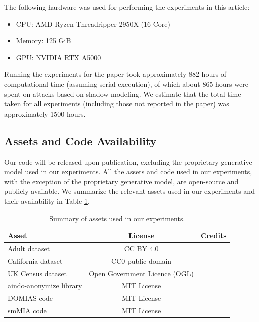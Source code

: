 The following hardware was used for performing the experiments in this article:
\begin{itemize}
    \item CPU: AMD Ryzen Threadripper 2950X (16-Core)
    \item Memory: 125 GiB
    \item GPU: NVIDIA RTX A5000
\end{itemize}

Running the experiments for the paper took approximately 882 hours of computational time (assuming serial execution), of which about 865 hours were spent on attacks based on shadow modeling.
We estimate that the total time taken for all experiments (including those not reported in the paper) was approximately 1500 hours.


\subsection{Assets and Code Availability}
\label{app:assets_code_availability}
Our code will be released upon publication, excluding the proprietary generative model used in our experiments.
All the assets and code used in our experiments, with the exception of the proprietary generative model, are open-source and publicly available.
We summarize the relevant assets used in our experiments and their availability in Table \ref{tab:assets_summary}.
\begin{table}[h]
  \centering
  \caption{Summary of assets used in our experiments.}
  \begin{tabular}{lcc}
    \toprule
    Asset & License & Credits \\
    \midrule
    Adult dataset & CC BY 4.0 & \citet{adult} \\
    California dataset & CC0 public domain & \citet{california} \\
    UK Census dataset & Open Government Licence (OGL) & \citet{uk_census} \\
    aindo-anonymize library & MIT License & \citet{aindo-anonymize} \\
    DOMIAS code & MIT License & \citet{van2023membership} \\
    smMIA code & MIT License & \citet{meeus2023achilles} \\
    \bottomrule
  \end{tabular}
  \label{tab:assets_summary}
\end{table}
